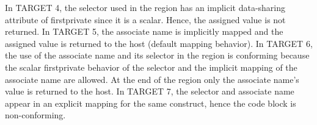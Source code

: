 \begin{fortranspecific}[4ex]
In TARGET 4, the  selector used in the  region 
has an implicit data-sharing attribute of firstprivate since it is a scalar.
Hence, the assigned value is not returned.
In TARGET 5, the associate name  is implicitly mapped and the
assigned value is returned to the host (default  mapping behavior).
In TARGET 6, the use of the associate name and its selector in the 
region is conforming because the scalar firstprivate behavior of the selector 
and the implicit mapping of the associate name are allowed.  
At the end of the  region only the 
associate name's value is returned to the host. 
In TARGET 7, the selector and associate name appear in
an explicit mapping for the same  construct, 
hence the code block is non-conforming.

\end{fortranspecific}

